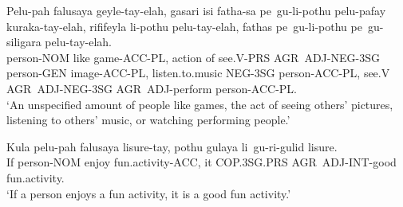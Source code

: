 \begin{exe}
\ex{} \gll{}Pelu-pah falusaya geyle-tay-elah, gasari isi fatha-sa pe~gu-li-pothu pelu-pafay kuraka-tay-elah, rififeyla li-pothu pelu-tay-elah, fathas pe~gu-li-pothu pe~gu-siligara pelu-tay-elah.\\
 person-NOM like game-ACC-PL, action of see.V-PRS AGR~ADJ-NEG-3SG person-GEN image-ACC-PL, listen.to.music NEG-3SG person-ACC-PL, see.V AGR~ADJ-NEG-3SG AGR~ADJ-perform person-ACC-PL.\\
\glt{}`An unspecified amount of people like games, the act of seeing others' pictures, listening to others' music, or watching performing people.'
\end{exe}

\begin{exe}
    \ex{} \gll{}Kula pelu-pah   falusaya lisure-tay,       pothu gulaya      li~gu-ri-gulid   lisure.\\
                If   person-NOM enjoy    fun.activity-ACC, it    COP.3SG.PRS AGR~ADJ-INT-good fun.activity.\\
    \glt{}`If a person enjoys a fun activity, it is a good fun activity.'
\end{exe}

